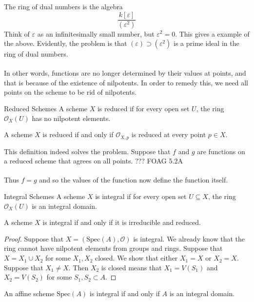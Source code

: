 \documentclass[a4paper]{article}
\begin{document}
The ring of dual numbers is the algebra $$\frac{k[\varepsilon]}{(\varepsilon^2)}$$ Think of $\varepsilon$ as an infinitesimally small number, but $\varepsilon^2=0$. This gives a example of the above. Evidently, the problem is that $(\varepsilon)\supset(\varepsilon^2)$ is a prime ideal in the ring of dual numbers. \\~\\

In other words, functions are no longer determined by their values at points, and that is because of the existence of nilpotents. In order to remedy this, we need all points on the scheme to be rid of nilpotents. 

\begin{defn}{Reduced Schemes}{} A scheme $X$ is reduced if for every open set $U$, the ring $\mathcal{O}_X(U)$ has no nilpotent elements. 
\end{defn}

\begin{prp}{}{} A scheme $X$ is reduced if and only if $\mathcal{O}_{X,p}$ is reduced at every point $p\in X$. 
\end{prp}

This definition indeed solves the problem. Suppose that $f$ and $g$ are functions on a reduced scheme that agrees on all points. ??? FOAG 5.2A\\~\\
Thus $f=g$ and so the values of the function now define the function itself. 

\begin{defn}{Integral Schemes}{} A scheme $X$ is integral if for every open set $U\subseteq X$, the ring $\mathcal{O}_X(U)$ is an integral domain. 
\end{defn}

\begin{prp}{}{} A scheme $X$ is integral if and only if it is irreducible and reduced. \tcbline
\begin{proof}
Suppose that $X=(\text{Spec}(A),\mathcal{O})$ is integral. We already know that the ring cannot have nilpotent elements from groups and rings. Suppose that $X=X_1\cup X_2$ for some $X_1,X_2$ closed. We show that either $X_1=X$ or $X_2=X$. Suppose that $X_1\neq X$. Then $X_2$ is closed means that $X_1=V(S_1)$ and $X_2=V(S_2)$ for some $S_1,S_2\subset A$. 
\end{proof}
\end{prp}

\begin{prp}{}{} An affine scheme $\text{Spec}(A)$ is integral if and only if $A$ is an integral domain. 
\end{prp}
\end{document}

